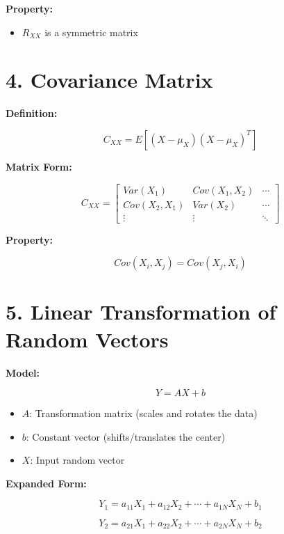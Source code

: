 ﻿\documentclass[12pt]{article}
\begin{document}
\textbf{Property:}


\begin{itemize}
\item $R_{XX}$ is a symmetric matrix
\end{itemize}




\section*{4. Covariance Matrix}


\vspace{0.2cm}


\textbf{Definition:}


\[
C_{XX} = E[(X - \mu_X)(X - \mu_X)^T]
\]


\textbf{Matrix Form:}


\[
C_{XX} =
\begin{bmatrix}
Var(X_1) & Cov(X_1,X_2) & \cdots \\
Cov(X_2,X_1) & Var(X_2) & \cdots \\
\vdots & \vdots & \ddots
\end{bmatrix}
\]


\textbf{Property:}


\[
Cov(X_i, X_j) = Cov(X_j, X_i)
\]




\section*{5. Linear Transformation of Random Vectors}


\vspace{0.2cm}


\textbf{Model:}


\[
Y = AX + b
\]


\begin{itemize}
\item $A$: Transformation matrix (scales and rotates the data)
\item $b$: Constant vector (shifts/translates the center)
\item $X$: Input random vector
\end{itemize}


\textbf{Expanded Form:}


\[
Y_1 = a_{11}X_1 + a_{12}X_2 + \cdots + a_{1N}X_N + b_1
\]


\[
Y_2 = a_{21}X_1 + a_{22}X_2 + \cdots + a_{2N}X_N + b_2
\]
\end{document}
